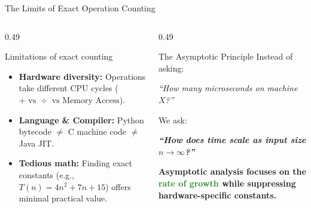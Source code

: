 \documentclass[aspectratio=169]{beamer}
\begin{document}
\begin{frame}{The Limits of Exact Operation Counting}
  \begin{columns}[T]
    \begin{column}{0.49\textwidth}
      \begin{alertblock}{Limitations of exact counting}
        \small
        \begin{itemize}
          \item \textbf{Hardware diversity:} Operations take different CPU cycles ($+ \text{ vs } \div \text{ vs Memory Access}$).
          \item \textbf{Language \& Compiler:} Python bytecode $\neq$ C machine code $\neq$ Java JIT.
          \item \textbf{Tedious math:} Finding exact constants (e.g., $T(n) = 4n^2 + 7n + 15$) offers minimal practical value.
        \end{itemize}
      \end{alertblock}
    \end{column}
    \begin{column}{0.49\textwidth}
      \begin{exampleblock}{The Asymptotic Principle}
        \small
        Instead of asking:
        \begin{center}
          \textit{``How many microseconds on machine $X$?''}
        \end{center}
        We ask:
        \begin{center}
          \textit{\textbf{``How does time scale as input size $n \to \infty$?''}}
        \end{center}
      \end{exampleblock}
      \vspace{0.3em}
      \begin{tcolorbox}[colframe=ForestGreen,colback=SoftGreen!40,arc=1.5mm,center]
        \centering\scriptsize\bfseries
        Asymptotic analysis focuses on the \textcolor{ForestGreen}{rate of growth} while suppressing hardware-specific constants.
      \end{tcolorbox}
    \end{column}
  \end{columns}
\end{frame}
\end{document}
